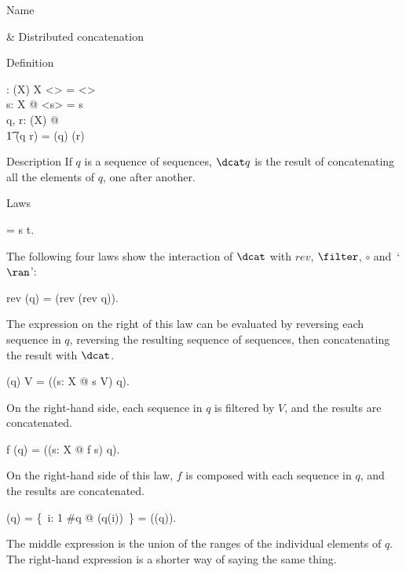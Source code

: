 \begin{manpage}\label{p:4070}
\item[Name]
\begin{name}
        \dcat & Distributed concatenation%
                \symdex{$\dcat$}
\end{name}

\item[Definition]
\begin{gendef}[X]
        \dcat: \seq (\seq X) \fun \seq X
\where
        \dcat <> = <> \\
        \forall s: \seq X @ \dcat <s> = s \\
        \forall q, r: \seq (\seq X) @ \\
\t1         \dcat (q \cat r) = (\dcat q) \cat (\dcat r)
\end{gendef}

\item[Description]
If $q$ is a sequence of sequences, $\dcat q$ is the result of
concatenating all the elements of $q$, one after another.

\item[Laws]
\begin{laws}
         = s \cat t. \\
\end{laws}
The following four laws show the interaction of $\dcat$ with $rev$,
$\filter$, $\circ$ and~`$\ran$':
\begin{laws}
        rev (\dcat q) = \dcat (rev (rev \circ q)).
\end{laws}
The expression on the right of this law can be evaluated by reversing
each sequence in $q$, reversing the resulting sequence of sequences,
then concatenating the result with $\dcat$.
\begin{laws}
        (\dcat q) \filter V =
                \dcat ((\lambda s: \seq X @ s \filter V) \circ q).
\end{laws}
On the right-hand side, each sequence in $q$ is filtered by $V$, and
the results are concatenated.
\begin{laws}
        f \circ (\dcat q) = 
                \dcat ((\lambda s: \seq X @ f \circ s) \circ q).
\end{laws}
On the right-hand side of this law, $f$ is composed with each sequence
in $q$, and the results are concatenated.
\begin{laws}
        \ran (\dcat q) = \bigcup \{~i: 1 \upto \#q @ \ran (q(i))~\}
			= \bigcup(\ran(\ran \circ q)).
\end{laws}
The middle expression is the union of the ranges of the
individual elements of $q$. The right-hand expression is a shorter
way of saying the same thing.
\end{manpage}
